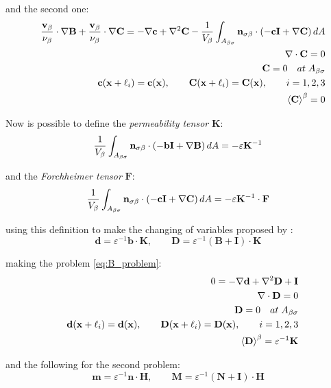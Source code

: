 and the second one:
\begin{eqnarray}
&&\dfrac{\textbf{v}_{\beta}}{\nu_{\beta}} \cdot  \nabla \mathbf{B} +\dfrac{\textbf{v}_{\beta}}{\nu_{\beta}} \cdot  \nabla \mathbf{C} = -\nabla \mathbf{c} +  \nabla^2 \mathbf{C} - \dfrac{1}{V_\beta} \int_{A_{\beta \sigma}} \mathbf{n}_{\sigma \beta} \cdot \left(-\mathbf{c}\mathbf{I}  +  \nabla \mathbf{C} \right) dA  \\
&& \nabla \cdot \mathbf{C} = 0  \\
&&\mathbf{C} = 0 \quad at \; A_{\beta \sigma} \\
&& \mathbf{c}(\mathbf{x} +\ell_i) = \mathbf{c}(\mathbf{x}), \qquad \mathbf{C}(\mathbf{x} +\ell_i) = \mathbf{C}(\mathbf{x}), \qquad i=1,2,3 \\
&& {\left< \mathbf{C} \right>}^{\beta} = 0
\label{eq:C_problem}
\end{eqnarray}

Now is possible to define the \textit{permeability tensor} $\mathbf{K}$:
$$
 \dfrac{1}{V_\beta} \int_{A_{\beta \sigma}} \mathbf{n}_{\sigma \beta} \cdot \left(-\mathbf{b}\mathbf{I}  +  \nabla \mathbf{B} \right) dA = -\varepsilon \mathbf{K}^{-1}
$$

and the \textit{Forchheimer tensor} $\mathbf{F}$:
$$
\dfrac{1}{V_\beta} \int_{A_{\beta \sigma}} \mathbf{n}_{\sigma \beta} \cdot \left(-\mathbf{c}\mathbf{I}  +  \nabla \mathbf{C} \right) dA = -\varepsilon \mathbf{K}^{-1} \cdot \mathbf{F}
$$

using this definition to make the changing of variables proposed by \citet{barrere1992closure}:
$$
\mathbf{d} = \varepsilon^{-1} \mathbf{b} \cdot \mathbf{K}, \qquad \mathbf{D} = \varepsilon^{-1} \left(\mathbf{B} + \mathbf{I} \right)\cdot \mathbf{K}
$$

 making the problem \eqref{eq:B_problem}:
 \begin{eqnarray}
 && 0 = -\nabla \mathbf{d} + \nabla^2 \mathbf{D} +\mathbf{I}\\
 && \nabla \cdot \mathbf{D} = 0  \\
 &&\mathbf{D} = 0 \quad at \; A_{\beta \sigma} \\
 && \mathbf{d}(\mathbf{x} +\ell_i) = \mathbf{d}(\mathbf{x}), \qquad \mathbf{D}(\mathbf{x} +\ell_i) = \mathbf{D}(\mathbf{x}), \qquad i=1,2,3 \\
 && {\left< \mathbf{D} \right>}^{\beta} = \varepsilon^{-1} \mathbf{K}
 \label{eq:D_problem}
 \end{eqnarray}

and the following for the second problem:
$$
\mathbf{m} = \varepsilon^{-1} \mathbf{n} \cdot \mathbf{H}, \qquad \mathbf{M} = \varepsilon^{-1} \left(\mathbf{N} + \mathbf{I} \right)\cdot \mathbf{H}
$$


